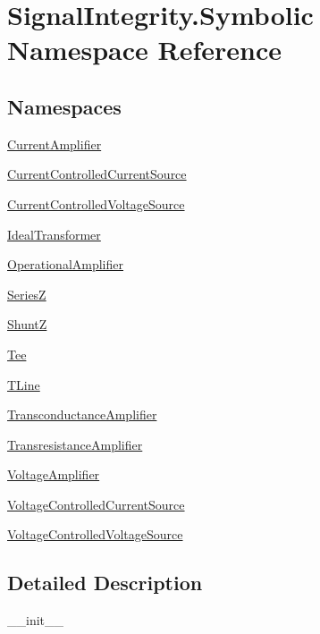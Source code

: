 \hypertarget{namespaceSignalIntegrity_1_1Symbolic}{}\section{Signal\+Integrity.\+Symbolic Namespace Reference}
\label{namespaceSignalIntegrity_1_1Symbolic}
\subsection*{Namespaces}
\begin{DoxyCompactItemize}
\item 
 \hyperlink{namespaceSignalIntegrity_1_1Symbolic_1_1CurrentAmplifier}{Current\+Amplifier}
\item 
 \hyperlink{namespaceSignalIntegrity_1_1Symbolic_1_1CurrentControlledCurrentSource}{Current\+Controlled\+Current\+Source}
\item 
 \hyperlink{namespaceSignalIntegrity_1_1Symbolic_1_1CurrentControlledVoltageSource}{Current\+Controlled\+Voltage\+Source}
\item 
 \hyperlink{namespaceSignalIntegrity_1_1Symbolic_1_1IdealTransformer}{Ideal\+Transformer}
\item 
 \hyperlink{namespaceSignalIntegrity_1_1Symbolic_1_1OperationalAmplifier}{Operational\+Amplifier}
\item 
 \hyperlink{namespaceSignalIntegrity_1_1Symbolic_1_1SeriesZ}{SeriesZ}
\item 
 \hyperlink{namespaceSignalIntegrity_1_1Symbolic_1_1ShuntZ}{ShuntZ}
\item 
 \hyperlink{namespaceSignalIntegrity_1_1Symbolic_1_1Tee}{Tee}
\item 
 \hyperlink{namespaceSignalIntegrity_1_1Symbolic_1_1TLine}{T\+Line}
\item 
 \hyperlink{namespaceSignalIntegrity_1_1Symbolic_1_1TransconductanceAmplifier}{Transconductance\+Amplifier}
\item 
 \hyperlink{namespaceSignalIntegrity_1_1Symbolic_1_1TransresistanceAmplifier}{Transresistance\+Amplifier}
\item 
 \hyperlink{namespaceSignalIntegrity_1_1Symbolic_1_1VoltageAmplifier}{Voltage\+Amplifier}
\item 
 \hyperlink{namespaceSignalIntegrity_1_1Symbolic_1_1VoltageControlledCurrentSource}{Voltage\+Controlled\+Current\+Source}
\item 
 \hyperlink{namespaceSignalIntegrity_1_1Symbolic_1_1VoltageControlledVoltageSource}{Voltage\+Controlled\+Voltage\+Source}
\end{DoxyCompactItemize}


\subsection{Detailed Description}
\begin{DoxyVerb}__init__\end{DoxyVerb}
 